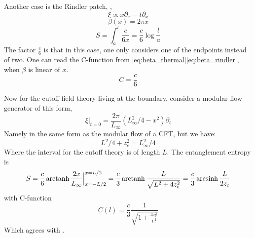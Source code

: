 \documentclass[11pt,a4paper]{article}
\begin{document}
	Another case is the Rindler patch, ,
	\begin{equation}
	\xi\propto x\partial_x-t\partial_x
	\end{equation}
	\begin{equation}
	\beta(x)=2\pi x
	\label{eq:beta_rindler}
	\end{equation}
	\begin{equation}
	S=\int_{a}^{l}\frac{c}{6x}=\frac{c}{6}\log \frac{l}{a}
	\end{equation}
	The factor $\frac{c}{6}$ is that in this case, one only considers one of the endpoints instead of two. One can read the C-function from \eqref{eq:beta_thermal}\eqref{eq:beta_rindler}, when $\beta$ is linear of $x$.
	\begin{equation}
	C=\frac{c}{6}
	\end{equation}
	
	
	Now for the cutoff field theory living at the boundary, consider a modular flow generator of this form,
	\begin{equation}
	\xi|_{t=0}=\frac{2\pi}{L_\infty}(L_\infty^2/4-x^2)\partial_t
	\end{equation}
	Namely in the same form as the modular flow of a CFT, but we have:
	\begin{equation}
	L^2/4+z_c^2=L_\infty^2/4
	\end{equation}
	Where the interval for the cutoff theory is of length $L$. The entanglement entropy is
	\begin{equation}
	S=\frac{c}{6}\operatorname{arctanh}\frac{2x}{L_\infty}\Big|_{x=-L/2}^{x=L/2}
	=\frac{c}{3}\operatorname{arctanh}\frac{L}{\sqrt{L^2+4z_c^2}}
	=\frac{c}{3}\operatorname{arcsinh}\frac{L}{2z_c}
	\end{equation}
	with C-function
	\begin{equation}
	C(l)=\frac{c}{3}\frac{1}{\sqrt{1+\frac{4z_c^2}{L^2}}}
	\end{equation}
	Which agrees with \cite{Lewkowycz:2019xse}. 
	
\end{document}
